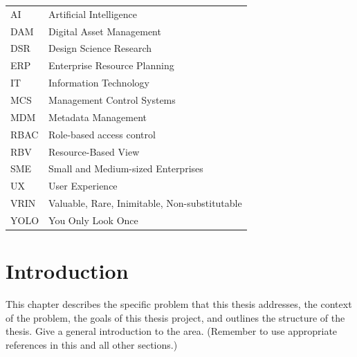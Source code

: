 \documentclass[a4paper,12pt,twocolumn]{article}
\numberwithin{figure}{section}
\numberwithin{table}{section}
\begin{document}
\renewcommand{\arraystretch}{1.2} %
\begin{flushleft} %
\begin{longtable}{p{5cm} p{12cm}} %
    
    AI   & Artificial Intelligence \\
    DAM  & Digital Asset Management \\
    DSR  & Design Science Research \\
    ERP  & Enterprise Resource Planning \\
    IT   & Information Technology \\
    MCS  & Management Control Systems \\
    MDM  & Metadata Management \\
    RBAC & Role-based access control \\
    RBV  & Resource-Based View \\
    SME  & Small and Medium-sized Enterprises \\
    UX   & User Experience \\
    VRIN & Valuable, Rare, Inimitable, Non-substitutable \\
    YOLO & You Only Look Once \\
    
\end{longtable}
\end{flushleft}



\twocolumn
\flushbottom %


\sloppy        %



\section{Introduction}

This chapter describes the specific problem that this thesis addresses, the context of the problem,
the goals of this thesis project, and outlines the structure of the thesis.
Give a general introduction to the area. (Remember to use appropriate references in this and all
other sections.)
\end{document}
